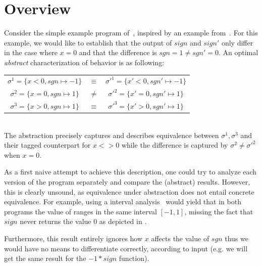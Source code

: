 \section{Overview}



Consider the simple example program of~, inspired by an example from~\cite{MauborgneRival07}. For this example, we would like to establish that the output of $sign$ and $sign'$ only differ in the case where $x=0$ and that the difference is $sgn = 1 \neq sgn' = 0$. An optimal \emph{abstract} characterization of behavior is as following:
\\
\begin{tabular}{ccc}
$\sigma^1 = \{x < 0, sgn \mapsto -1\}$ & $\equiv$ & $\sigma'^1 = \{x' < 0, sgn' \mapsto -1\}$
\\
$\sigma^2 = \{x = 0, sgn \mapsto 1\}$ & $\neq$ & $\sigma'^2 = \{x' = 0, sgn' \mapsto 1\}$
\\
$\sigma^3 = \{x > 0, sgn \mapsto 1\}$ & $\equiv$ & $\sigma'^3 = \{x' > 0, sgn' \mapsto 1\}$
\\
\end{tabular}
\\
The abstraction precisely captures and describes equivalence between $\sigma^1,\sigma^3$ and their tagged counterpart for $x <> 0$ while the difference is captured by $\sigma^2 \neq \sigma'^2$ when $x = 0$.

As a first naive attempt to achieve this description, one could try to analyze each version of the program separately and compare the (abstract) results. However, this is clearly unsound, as equivalence under abstraction does not entail concrete equivalence. For example, using a interval analysis~\cite{TODO} would yield that in both programs the value of  ranges in the same interval $[-1,1]$, missing the fact that $sign$ never returns the value $0$ as depicted in .


Furthermore, this result entirely ignores how $x$ affects the value of $sgn$ thus we would have no means to differentiate correctly, according to input (e.g. we will get the same result for the $-1 * sign$ function).

